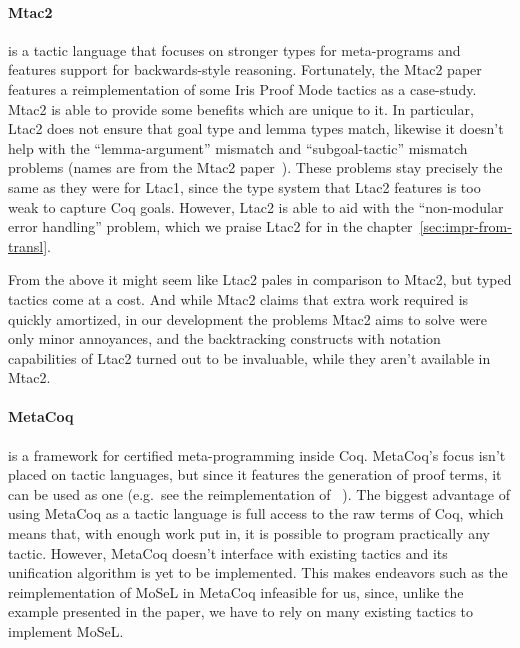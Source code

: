 \paragraph{Mtac2~\cite{kaiserMtac2TypedTactics2018a}} is a tactic language that focuses on stronger types for meta-programs and features support for backwards-style reasoning.
  Fortunately, the Mtac2 paper~\cite{kaiserMtac2TypedTactics2018a} features a reimplementation of some Iris Proof Mode tactics as a case-study.
  Mtac2 is able to provide some benefits which are unique to it.
  In particular, Ltac2 does not ensure that goal type and lemma types match, likewise it doesn't help with the ``lemma-argument'' mismatch and ``subgoal-tactic'' mismatch problems (names are from the Mtac2 paper~\cite[Section~5.4]{kaiserMtac2TypedTactics2018a}).
  These problems stay precisely the same as they were for Ltac1, since the type system that Ltac2 features is too weak to capture Coq goals.
  However, Ltac2 is able to aid with the ``non-modular error handling'' problem, which we praise Ltac2 for in the chapter~\ref{sec:impr-from-transl}.

  From the above it might seem like Ltac2 pales in comparison to Mtac2, but typed tactics come at a cost.
  And while Mtac2 claims that extra work required is quickly amortized, in our development the problems Mtac2 aims to solve were only minor annoyances, and the backtracking constructs with notation capabilities of Ltac2 turned out to be invaluable, while they aren't available in Mtac2.

\paragraph{MetaCoq~\cite{sozeauMetaCoqProject2020}} is a framework for certified meta-programming inside Coq.
  MetaCoq's focus isn't placed on tactic languages, but since it features the generation of proof terms, it can be used as one (e.g.\ see the reimplementation of ~\cite[Section~4.2]{sozeauMetaCoqProject2020}).
  The biggest advantage of using MetaCoq as a tactic language is full access to the raw terms of Coq, which means that, with enough work put in, it is possible to program practically any tactic.
  However, MetaCoq doesn't interface with existing tactics and its unification algorithm is yet to be implemented.
  This makes endeavors such as the reimplementation of MoSeL in MetaCoq infeasible for us, since, unlike the example presented in the paper, we have to rely on many existing tactics to implement MoSeL.

